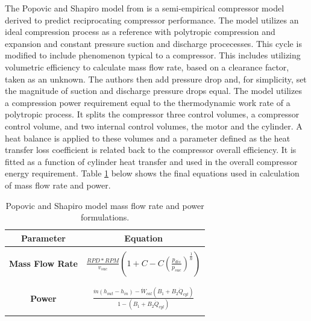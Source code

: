 \documentclass[preprint,11pt,authoryear]{elsarticle}
\begin{document}
The Popovic and Shapiro model from \cite{Popovic1995a} is a semi-empirical compressor model derived to predict reciprocating compressor performance. The model utilizes an ideal compression process as a reference with polytropic compression and expansion and constant pressure suction and discharge procecesses. This cycle is modified to include phenomenon typical to a compressor. This includes utilizing volumetric efficiency to calculate mass flow rate, based on a clearance factor, taken as an unknown. The authors then add pressure drop and, for simplicity, set the magnitude of suction and discharge pressure drops equal. The model utilizes a compression power requirement equal to the thermodynamic work rate of a polytropic process. It splits the compressor three control volumes, a compressor control volume, and two internal control volumes, the motor and the cylinder. A heat balance is applied to these volumes and a parameter defined as the heat transfer loss coefficient is related back to the compressor overall efficiency. It is fitted as a function of cylinder heat transfer and used in the overall compressor energy requirement. Table \ref{Tab:pop_eqs} below shows the final equations used in calculation of mass flow rate and power.

\begin{table}[h]
\caption{Popovic and Shapiro model mass flow rate and power formulations.}
\label{Tab:pop_eqs}
\begin{center}
\begin{tabular}{c c}
\hline
\hline
\textbf{Parameter} & Equation \\
\hline
\hline 
\\[-2ex] %
\textbf{Mass Flow Rate} & \(\displaystyle \frac{RPD*RPM}{v_{suc}}(1 + C - C(\frac{p_{dis}}{p_{suc}})^{\frac{1}{n}})\) \\
\\[-2ex] %
\hline %
\\[-2ex] %
\textbf{Power} & \(\displaystyle \frac{\dot{m}(h_{out}-h_{in})- \dot{W}_{cal}(B_1+B_2\dot{Q}_{cyl})}{1 - (B_1+B_2\dot{Q}_{cyl})} \)
\\
\\[-2ex] %
\hline
\hline
\end{tabular}
\end{center}
\end{table}
\end{document}
